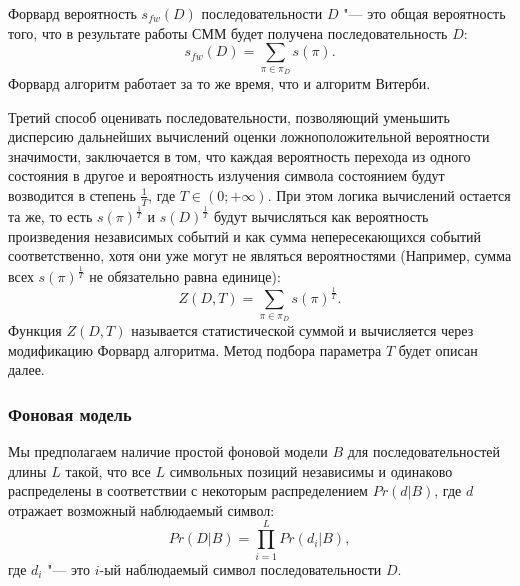 \documentclass[specialist,
substylefile = spbu_report.rtx,
subf,href,colorlinks=true, 12pt]{disser}
\begin{document}
			Форвард вероятность $s_{fw}(D)$ последовательности $D$ "--- это общая вероятность того, что в результате работы СММ будет получена последовательность $D$:
			\begin{equation}
				s_{fw}(D) = \sum_{\pi \in \pi_{D}}s(\pi).
			\end{equation}
			Форвард алгоритм работает за то же время, что и алгоритм Витерби.
			
			Третий способ оценивать последовательности, позволяющий уменьшить дисперсию дальнейших вычислений оценки ложноположительной вероятности значимости, заключается в том, что каждая вероятность перехода из одного состояния в другое и вероятность излучения символа состоянием будут возводится в степень $\frac{1}{T}$, где $T \in (0; +\infty)$. При этом логика вычислений остается та же, то есть $s(\pi)^{\frac{1}{T}}$ и $s(D)^{\frac{1}{T}}$ будут вычисляться как вероятность произведения независимых событий и как сумма непересекающихся событий соответственно, хотя они уже могут не являться вероятностями (Например, сумма всех $s(\pi)^\frac{1}{T}$ не обязательно равна единице):
			\begin{equation}
				Z(D, T)	= \sum_{\pi \in \pi_{D}}s(\pi)^{\frac{1}{T}}.
			\end{equation}		
			Функция $Z(D, T)$ называется статистической суммой и вычисляется через модификацию Форвард алгоритма. Метод подбора параметра $T$ будет описан далее.
			
			\subsubsection{Фоновая модель}
			Мы предполагаем наличие простой фоновой модели $B$ для последовательностей длины $L$ такой, что все $L$ символьных позиций независимы и одинаково распределены в соответствии с некоторым распределением $Pr(d|B)$, где $d$ отражает возможный наблюдаемый символ:
			\begin{equation}
				Pr(D|B) = \prod_{i=1}^{L}Pr(d_{i}|B),
			\end{equation}
			где $d_{i}$ "--- это $i$-ый наблюдаемый символ последовательности $D$.
			
\end{document}
